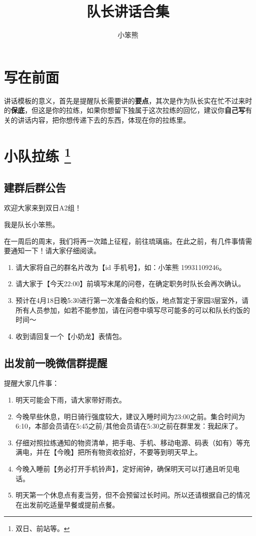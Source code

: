 \documentclass[UTF8]{ctexart}
\title{队长讲话合集}
\author{小笨熊}
\begin{document}
\maketitle

\tableofcontents

\section{写在前面}

讲话模板的意义，首先是提醒队长需要讲的\textbf{要点}，其次是作为队长实在忙不过来时的\textbf{保底}，但这是你的拉练，如果你想留下独属于这次拉练的回忆，建议你\textbf{自己写}有关的讲话内容，把你想传递下去的东西，体现在你的拉练里。

\section[小队拉练]{小队拉练 \protect\footnote{双日、前站等。} }

\subsection{建群后群公告}

欢迎大家来到双日A2组！

我是队长小笨熊。

在一周后的周末，我们将再一次踏上征程，前往琉璃庙。在此之前，有几件事情需要通知一下！请大家仔细阅读。

\begin{enumerate}[nosep,left=4em]
    \item 请大家将自己的群名片改为【id 手机号】，如：小笨熊 19931109246。
    \item 请大家于【今天22:00】前填写末尾的问卷，在确定职务时队长会再次确认。    
    \item 预计在4月18日晚5:30进行第一次准备会和约饭，地点暂定于家园3层室外，请所有人员参加，如若不能参加，请在问卷中填写尽可能多的可以和队长约饭的时间～    
    \item 收到请回复一个【小奶龙】表情包。
\end{enumerate}


\subsection{出发前一晚微信群提醒}\label{小队}

提醒大家几件事：
\begin{enumerate}[nosep,left=4em]
    \item 明天可能会下雨，请大家带好雨衣。
    \item 今晚早些休息，明日骑行强度较大，建议入睡时间为23:00之前。集合时间为6:10，本部会员请在5:45之前/其他会员请在5:30之前在群里发：我起床了。
    \item 仔细对照拉练通知的物资清单，把手电、手机、移动电源、码表（如有）等充满电，并在【今晚】把所有物资收拾好，不要等到明天早上。
    \item 今晚入睡前【务必打开手机铃声】，定好闹钟，确保明天可以打通且听见电话。
    \item 明天第一个休息点有麦当劳，但不会预留过长时间。所以还请根据自己的情况在出发前吃适量早餐或提前点餐。
\end{enumerate}
\end{document}
